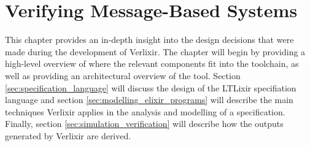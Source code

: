 \chapter{Verifying Message-Based Systems} \label{chap:design}
This chapter provides an in-depth insight into the design decisions that were made during the development of Verlixir. The chapter will begin by providing a high-level overview of where the relevant components fit into the toolchain, as well as providing an architectural overview of the tool. Section \ref{sec:specification_language} will discuss the design of the LTLixir specifiation language and section \ref{sec:modelling_elixir_programs} will describe the main techniques Verlixir applies in the analysis and modelling of a specification. Finally, section \ref{sec:simulation_verification} will describe how the outputs generated by Verlixir are derived.  
